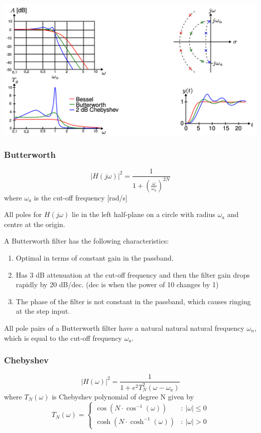 \begin{center}
  \includegraphics[width=\textwidth]{Images/Filter-Transform.png} 
\end{center}

\subsubsection{Butterworth}
$$|H(j\omega)|^2=\frac{1}{1+(\frac{\omega}{\omega_{a}})^{2N}}$$
where $\omega_{a}$ is the cut-off frequency [rad/s]

All poles for $H(j\omega)$ lie in the left half-plane on a circle with radius $\omega_{a}$ and centre at the origin.

A Butterworth filter has the following characteristics:
\begin{enumerate}
  \item Optimal in terms of constant gain in the passband.
  \item Has 3 dB attenuation at the cut-off frequency and then the filter gain drops rapidly by 20 dB/dec. (dec is when the power of 10 changes by 1)
  \item The phase of the filter is not constant in the passband, which causes ringing at the step input.
\end{enumerate}
All pole pairs of a Butterworth filter have a natural natural natural frequency $\omega_{n}$, which is equal to the cut-off frequency $\omega_a$.

\subsubsection{Chebyshev}
$$|H(\omega)|^2=\frac{1}{1+e^{ 2 }T_{N}^2(\omega-\omega_{a})}$$
where $T_{N}(\omega)$ is Chebyshev polynomial of degree N given by
$$T_{N}(\omega)=\left\{ \begin{array}{cl}
\cos(N\cdot \cos^{-1}(\omega)) & : \ |\omega| \leq 0 \\
\cosh(N\cdot \cosh^{-1}(\omega)) & : \ |\omega| > 0
\end{array} \right.$$

